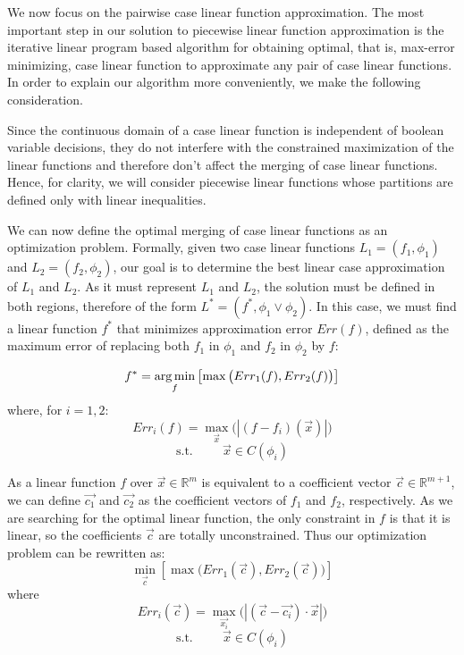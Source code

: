 We now focus on the pairwise case linear function approximation. The most important step in our solution to piecewise linear function approximation is the iterative linear program based algorithm for obtaining optimal, that is, max-error minimizing, case linear function to approximate any pair of case linear functions. In order to explain our algorithm more conveniently, we make the following consideration.

Since the continuous domain of a case linear function is independent of boolean variable decisions, they do not interfere with the constrained maximization of the linear functions and therefore don't affect the merging of case linear functions. Hence, for clarity, we will consider piecewise linear functions whose partitions are defined only with linear inequalities.

We can now define the optimal merging of case linear functions as an optimization problem. Formally, given two case linear functions $L_1 = ( f_1, \phi_1 )$ and $L_2 = ( f_2, \phi_2 )$, our goal is to determine the best linear case approximation of $L_1$ and $L_2$. As it must represent  $L_1$ and $L_2$, the solution must be defined in both regions, therefore of the form $L^* = (f^*,\phi_1 \lor  \phi_2)$. In this case, we must find a linear function $f^*$ that minimizes approximation error $Err(f)$, defined as the maximum  error of replacing both $f_1$ in $\phi_1$ and $f_2$ in $\phi_2$ by $f$:

\begin{equation} f^* = \argmin_f \left[ \max \big( Err_1(f), Err_2(f) \big) \right] \label{eq:fstar} \end{equation}
where, for $i = 1,2$:
\begin{equation} Err_i(f) = \max_{\vec{x}} \big(  | (f - f_i)(\vec{x}) | \big) \label{eq:errf} \end
{equation}
$$\text{s.t.} \hspace{1cm} \vec{x} \in C(\phi_i)$$

As a linear function $f$ over $\vec{x} \in \mathbb{R}^m$ is equivalent to a coefficient vector $\vec{c} \in \mathbb{R}^{m+1}$, we can define $\vec{c_1}$ and $\vec{c_2}$ as the coefficient vectors of $f_1$ and $f_2$, respectively. As we are searching for the optimal linear function, the only constraint in $f$ is that it is linear, so the coefficients $\vec{c}$ are totally unconstrained. Thus our optimization problem can be rewritten as:
\begin{equation} \min_{\vec{c}} \left[ \max \big( Err_1(\vec{c}), Err_2(\vec{c}) \big) \right] \label{eq:minc} \end{equation}
where
\begin{equation} Err_i(\vec{c}) = \max_{\vec{x_i}} \big(  | (\vec{c}-\vec{c_i}) \cdot \vec{x} |\big) \label{eq:errc} \end
{equation}
$$\text{s.t.} \hspace{1cm} \vec{x} \in C(\phi_i)$$

